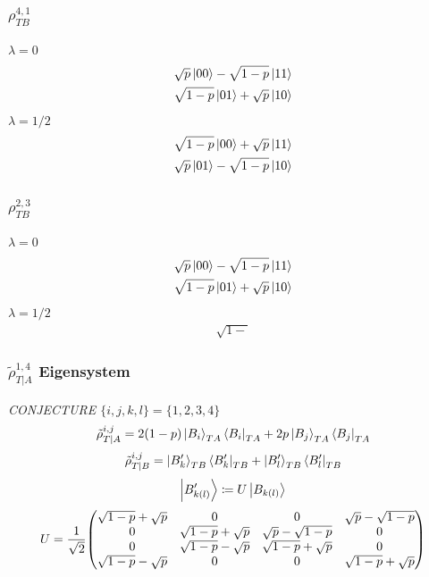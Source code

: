 \documentclass[12pt]{article}
\begin{document}
\subsubsection*{$\rho_{TB}^{4,1}$}
$\lambda = 0$
\begin{align*}
    \sqrt{p}\ket{00} - \sqrt{1-p}\ket{11} \\
    \sqrt{1-p}\ket{01} + \sqrt{p}\ket{10}
\end{align*}
$\lambda = 1/2$
\begin{align*}
    \sqrt{1-p}\ket{00} + \sqrt{p}\ket{11} \\
    \sqrt{p}\ket{01} - \sqrt{1-p}\ket{10}
\end{align*}

\subsubsection*{$\rho_{TB}^{2,3}$}
$\lambda = 0$
\begin{align*}
    \sqrt{p}\ket{00} - \sqrt{1-p}\ket{11} \\
    \sqrt{1-p}\ket{01} + \sqrt{p}\ket{10}
\end{align*}
$\lambda = 1/2$
\begin{align*}
    \sqrt{1-}
\end{align*}

\subsubsection*{$\tilde{\rho}_{T|A}^{1,4}$ Eigensystem}
\textit{CONJECTURE $\{i,j,k,l\} = \{1,2,3,4\}$}
\[ \tilde{\rho}_{T|A}^{i,j} = 2(1-p)\ket{B_i}_{TA} \bra{B_i}_{TA} + 2p\ket{B_j}_{TA}\bra{B_j}_{TA} \]
\[ \tilde{\rho}_{T|B}^{i,j} = \ket{B_k'}_{TB} \bra{B_k'}_{TB} + \ket{B_l'}_{TB} \bra{B_l'}_{TB} \]
\[ \ket{B_{k(l)}'} \coloneq U\ket{B_{k(l)}} \]
\[ U = \frac{1}{\sqrt{2}}\mqty(\sqrt{1-p}+\sqrt{p}&0&0&\sqrt{p}-\sqrt{1-p}\\0&\sqrt{1-p}+\sqrt{p}&\sqrt{p}-\sqrt{1-p}&0\\0&\sqrt{1-p}-\sqrt{p}&\sqrt{1-p}+\sqrt{p}&0\\\sqrt{1-p}-\sqrt{p}&0&0&\sqrt{1-p}+\sqrt{p}) \]
\end{document}
